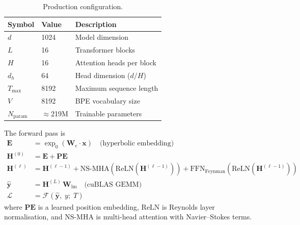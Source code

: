 \documentclass[11pt,a4paper]{article}
\newcommand{\calF}{\mathcal{F}}
\begin{document}
\begin{table}[htbp]
\centering
\caption{Production configuration.}
\label{tab:arch}
\begin{tabular}{lll}
\toprule
\textbf{Symbol} & \textbf{Value} & \textbf{Description}\\
\midrule
$d$             & 1024           & Model dimension\\
$L$             & 16             & Transformer blocks\\
$H$             & 16             & Attention heads per block\\
$d_h$           & 64             & Head dimension ($d/H$)\\
$T_{\max}$      & 8192           & Maximum sequence length\\
$V$             & 8192           & BPE vocabulary size\\
$N_{\text{param}}$ & $\approx$219M & Trainable parameters\\
\bottomrule
\end{tabular}
\end{table}

The forward pass is
\begin{align}
  \mathbf{E} &= \exp_0(\mathbf{W}_e \cdot \mathbf{x})
               \quad\text{(hyperbolic embedding)}\\
  \mathbf{H}^{(0)} &= \mathbf{E} + \mathbf{PE}\\
  \mathbf{H}^{(\ell)} &= \mathbf{H}^{(\ell-1)}
    + \mathrm{NS}\text{-}\mathrm{MHA}\!\left(\mathrm{ReLN}\!\left(\mathbf{H}^{(\ell-1)}\right)\right)
    + \mathrm{FFN}_{\text{Feynman}}\!\left(\mathrm{ReLN}\!\left(\mathbf{H}^{(\ell-1)}\right)\right)\\
  \hat{\mathbf{y}} &= \mathbf{H}^{(L)}\,\mathbf{W}_{\text{lm}}
    \quad\text{(cuBLAS GEMM)}\\
  \mathcal{L} &= \calF\!\left(\hat{\mathbf{y}},\;y;\;T\right)
\end{align}
where $\mathbf{PE}$ is a learned position embedding, $\mathrm{ReLN}$ is
Reynolds layer normalisation, and $\mathrm{NS}\text{-}\mathrm{MHA}$ is
multi-head attention with Navier--Stokes terms.
\end{document}
